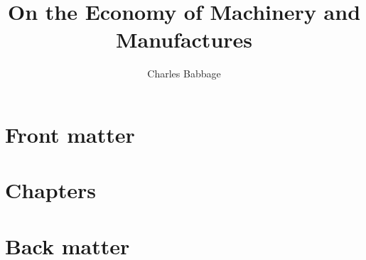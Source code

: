\documentclass[11pt]{book}
\title{On the Economy of Machinery and Manufactures}
\author{ Charles Babbage}
\begin{document}
\maketitle
\def\title#1{\chapter{#1}}
\tableofcontents

\part{Front matter}
        
        
        
        
\part{Chapters}
        
        
\part{Back matter}
        
        
\end{document}
